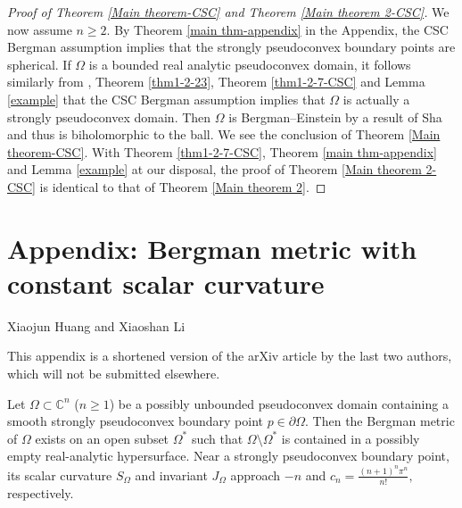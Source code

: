 \documentclass[a4paper,centertags,oneside,12pt]{amsart}
\numberwithin{equation}{section}
\begin{document}
\begin{proof}[Proof of Theorem \ref{Main theorem-CSC} and Theorem \ref{Main theorem 2-CSC}]
We now assume $n\ge 2$. By Theorem \ref{main thm-appendix} in the Appendix, the CSC Bergman assumption implies that the strongly pseudoconvex boundary points are spherical. If $\Omega$ is a bounded real analytic pseudoconvex domain, it follows similarly  from  \cite[Theorem~1.4]{MZ21}, Theorem \ref{thm1-2-23}, Theorem \ref{thm1-2-7-CSC} and Lemma \ref{example} that the CSC Bergman assumption implies that $\Omega$ is actually a strongly pseudoconvex domain. Then $\Omega$ is Bergman--Einstein   by a result of Sha \cite{Sh26} and thus is biholomorphic to the ball. We see the conclusion of Theorem \ref{Main theorem-CSC}. With  Theorem \ref{thm1-2-7-CSC},  Theorem \ref{main thm-appendix} and Lemma \ref{example} at our disposal, the proof of Theorem \ref{Main theorem 2-CSC} is identical  to that of Theorem \ref{Main theorem 2}.


\end{proof}

\vfill
\eject


\section{Appendix: Bergman metric with constant scalar curvature}


\begin{center}
     Xiaojun Huang and Xiaoshan Li
\end{center}



\bigskip
This appendix is a shortened version of the arXiv article \cite{HL26} by the last two authors, which will not be submitted elsewhere.

\bigskip



Let $\Omega\subset\mathbb C^n$ ($n\geq 1$) be a possibly unbounded pseudoconvex domain containing a smooth strongly pseudoconvex boundary point $p\in\partial\Omega$. Then the Bergman metric of \(\Omega\) exists on an open subset \(\Omega^*\) such that \(\Omega\setminus\Omega^*\) is contained in a possibly empty real-analytic hypersurface. Near a strongly pseudoconvex boundary point, its scalar curvature \(S_{\Omega}\) and invariant \(J_{\Omega}\) approach \(-n\) and
$c_n=\frac{(n+1)^n\pi^n}{n!},$ 
respectively.
\end{document}
